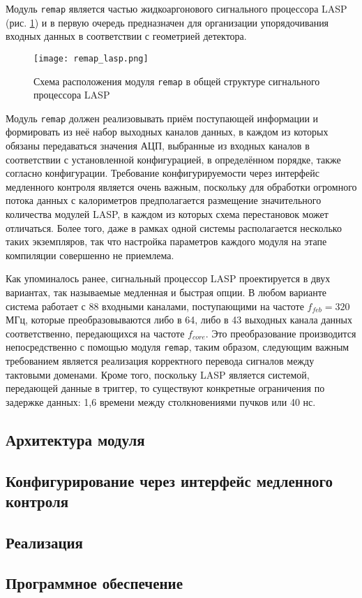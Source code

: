 Модуль \texttt{remap} является частью жидкоаргонового сигнального процессора LASP (рис. \ref{fig:remap_lasp}) и в первую очередь предназначен для организации упорядочивания входных данных в соответствии с геометрией детектора.\par
\begin{figure}[ht]
    \centering
    \texttt{[image: remap\_lasp.png]}
    \caption{Схема расположения модуля \texttt{remap} в общей структуре сигнального процессора LASP}
    \label{fig:remap_lasp}
\end{figure}\par
Модуль \texttt{remap} должен реализовывать приём поступающей информации и формировать из неё набор выходных каналов данных, в каждом из которых обязаны передаваться значения АЦП, выбранные из входных каналов в соответствии с установленной конфигурацией, в определённом порядке, также согласно конфигурации. Требование конфигурируемости через интерфейс медленного контроля является очень важным, поскольку для обработки огромного потока данных с калориметров предполагается размещение значительного количества модулей LASP, в каждом из которых схема перестановок может отличаться. Более того, даже в рамках одной системы располагается несколько таких экземпляров, так что настройка параметров каждого модуля на этапе компиляции совершенно не приемлема.\par
Как упоминалось ранее, сигнальный процессор LASP проектируется в двух вариантах, так называемые медленная и быстрая опции. В любом варианте система работает с 88 входными каналами, поступающими на частоте $f_{feb} = 320$ МГц, которые преобразовываются либо в 64, либо в 43 выходных канала данных соответственно, передающихся на частоте $f_{core}$. Это преобразование производится непосредственно с помощью модуля \texttt{remap}, таким образом, следующим важным требованием является реализация корректного перевода сигналов между тактовыми доменами. Кроме того, поскольку LASP является системой, передающей данные в триггер, то существуют конкретные ограничения по задержке данных: 1,6 времени между столкновениями пучков или 40 нс.\par

\subsection{Архитектура модуля}


\subsection{Конфигурирование через интерфейс медленного контроля}


\subsection{Реализация}


\subsection{Программное обеспечение}

